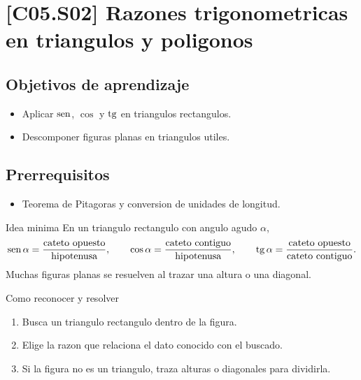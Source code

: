 \section{[C05.S02] Razones trigonometricas en triangulos y poligonos}

\subsection*{Objetivos de aprendizaje}
\begin{itemize}
  \item Aplicar \(\operatorname{sen}\), \(\cos\) y \(\operatorname{tg}\) en triangulos rectangulos.
  \item Descomponer figuras planas en triangulos utiles.
\end{itemize}

\subsection*{Prerrequisitos}
\begin{itemize}
  \item Teorema de Pitagoras y conversion de unidades de longitud.
\end{itemize}

\begin{theorybox}{Idea minima}
En un triangulo rectangulo con angulo agudo \(\alpha\),
\[
\operatorname{sen}\alpha=\frac{\text{cateto opuesto}}{\text{hipotenusa}},
\qquad
\cos\alpha=\frac{\text{cateto contiguo}}{\text{hipotenusa}},
\qquad
\operatorname{tg}\alpha=\frac{\text{cateto opuesto}}{\text{cateto contiguo}}.
\]
Muchas figuras planas se resuelven al trazar una altura o una diagonal.

\begin{center}
\end{center}
\end{theorybox}

\begin{methodbox}{Como reconocer y resolver}
\begin{enumerate}
  \item Busca un triangulo rectangulo dentro de la figura.
  \item Elige la razon que relaciona el dato conocido con el buscado.
  \item Si la figura no es un triangulo, traza alturas o diagonales para dividirla.
\end{enumerate}
\end{methodbox}

